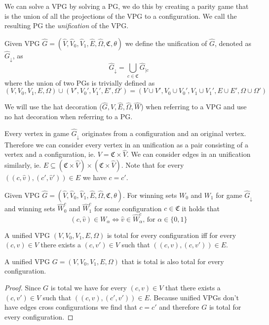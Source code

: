 We can solve a VPG by solving a PG, we do this by creating a parity game that is the union of all the projections of the VPG to a configuration. We call the resulting PG the \textit{unification} of the VPG.
\begin{definition}
Given VPG $\hat{G} = (\hat{V},\hat{V}_0,\hat{V}_1, \hat{E},\hat{\Omega}, \mathfrak{C},\theta)$ we define the unification of $\hat{G}$, denoted as $\hat{G}_{\downarrow}$, as
\[  \hat{G}_{\downarrow} = \bigcup_{c\in \mathfrak{C}}\hat{G}_{|c} \]
where the union of two PGs is trivially defined as
\[ (V,V_0,V_1,E,\Omega) \cup (V',V_0',V_1',E',\Omega') = (V \cup V', V_0 \cup V_0', V_1 \cup V_1', E \cup E', \Omega \cup \Omega') \]
\end{definition}
We will use the hat decoration ($\hat{G},\hat{V},\hat{E},\hat{\Omega},\hat{W}$) when referring to a VPG and use no hat decoration when referring to a PG.

Every vertex in game $\hat{G}_{\downarrow}$ originates from a configuration and an original vertex. Therefore we can consider every vertex in an unification as a pair consisting of a vertex and a configuration, ie. $V = \mathfrak{C} \times \hat{V}$. We can consider edges in an unification similarly, ie. $E \subseteq (\mathfrak{C} \times \hat{V}) \times (\mathfrak{C} \times \hat{V})$. Note that for every $((c,\hat{v}) , (c',\hat{v}')) \in E$ we have $c = c'$.

\begin{theorem}
	Given VPG $\hat{G} =  (\hat{V},\hat{V}_0,\hat{V}_1, \hat{E},\hat{\Omega}, \mathfrak{C},\theta)$. For winning sets $W_0$ and $W_1$ for game $\hat{G}_{\downarrow}$ and winning sets $\hat{W}^c_0$ and $\hat{W}^c_1$ for some configuration $c \in \mathfrak{C}$ it holds that
	\[ (c,\hat{v}) \in W_\alpha \iff \hat{v} \in \hat{W}^c_\alpha\text{, for }\alpha \in \{0,1\} \]
\end{theorem}
\begin{definition}
	A unified VPG $(V,V_0,V_1,E,\Omega)$ is total for every configuration iff for every $(c,v) \in V$ there exists a $(c,v') \in V$ such that $((c,v),(c,v')) \in E$.
\end{definition}

\begin{lemma}
	\label{lem_UVPG_total}
	A unified VPG $G = (V,V_0,V_1,E,\Omega)$ that is total is also total for every configuration.
	\begin{proof}
		Since $G$ is total we have for every $(c,v) \in V$ that there exists a $(c,v') \in V$ such that $((c,v),(c',v')) \in E$. Because unified VPGs don't have edges cross configurations we find that $c = c'$ and therefore $G$ is total for every configuration.
	\end{proof}
\end{lemma}
